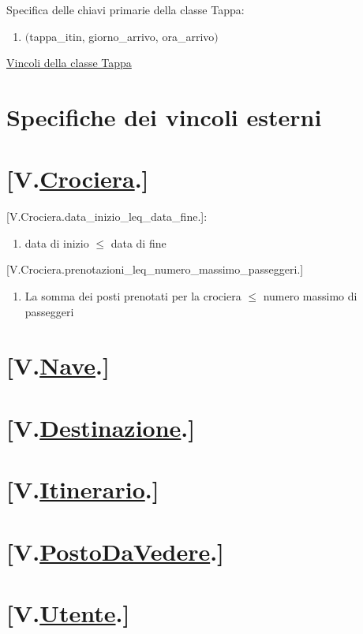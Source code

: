 \documentclass{article}
\begin{document}
Specifica delle chiavi primarie della classe Tappa:
\begin{enumerate}
    \item $($tappa\_itin, giorno\_arrivo, ora\_arrivo$)$
\end{enumerate}

\hyperref[sec:VincoliTappa]{Vincoli della classe Tappa}

\newpage
\section{Specifiche dei vincoli esterni}

\section*{[V.\hyperref[sec:Crociera]{Crociera}.]}\label{sec:VincoliCrociera}
    [V.Crociera.data\_inizio\_leq\_data\_fine.]:
    \begin{enumerate}
        \item data di inizio $\leq$ data di fine
    \end{enumerate}
    [V.Crociera.prenotazioni\_leq\_numero\_massimo\_passeggeri.]
    \begin{enumerate}
        \item La somma dei posti prenotati per la crociera $\leq$ numero massimo di passeggeri
    \end{enumerate}
\section*{[V.\hyperref[sec:Nave]{Nave}.]}\label{sec:VincoliNave}
\section*{[V.\hyperref[sec:Destinazione]{Destinazione}.]}\label{sec:VincoliDestinazione}
\section*{[V.\hyperref[sec:Itinerario]{Itinerario}.]}\label{sec:VincoliItinerario}
\section*{[V.\hyperref[sec:PostoDaVedere]{PostoDaVedere}.]}\label{sec:VincoliPostoDaVedere}
\section*{[V.\hyperref[sec:Utente]{Utente}.]}\label{sec:VincoliUtente}
\end{document}
